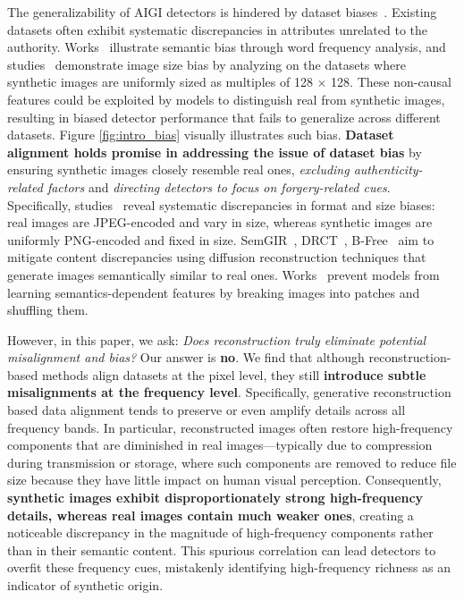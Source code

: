 \documentclass{article}
\begin{document}
The generalizability of AIGI detectors is hindered by dataset biases~\cite{grommelt2024fake, chen2024drct, rajan2025aligned, guillaro2024bias}. Existing datasets often exhibit systematic discrepancies in attributes unrelated to the authority. Works~\cite{tan2024c2p} illustrate semantic bias through word frequency analysis, and studies~\cite{sha2023fake} demonstrate image size bias by analyzing on the datasets where synthetic images are uniformly sized as multiples of 128 $\times$ 128. These non-causal features could be exploited by models to distinguish real from synthetic images, resulting in biased detector performance that fails to generalize across different datasets. Figure \ref{fig:intro_bias} visually illustrates such bias.
\textbf{Dataset alignment holds promise in addressing the issue of dataset bias} by ensuring synthetic images closely resemble real ones, \textit{excluding authenticity-related factors} and \textit{directing detectors to focus on forgery-related cues}. 
Specifically, studies~\cite{grommelt2024fake} reveal systematic discrepancies in format and size biases: real images are JPEG-encoded and vary in size, whereas synthetic images are uniformly PNG-encoded and fixed in size.  SemGIR~\cite{yu2024semgir}, DRCT~\cite{chen2024drct}, B-Free~\cite{guillaro2024bias} aim to mitigate content discrepancies using diffusion reconstruction techniques that generate images semantically similar to real ones.  
Works~\cite{gye2025sfld, zheng2024breaking,zhou2025breaking} prevent models from learning semantics-dependent features by breaking images into patches and shuffling them.


However, in this paper, we ask: \emph{Does reconstruction truly eliminate potential misalignment and bias?} Our answer is \textbf{no}. We find that although reconstruction-based methods align datasets at the pixel level, they still \textbf{introduce subtle misalignments at the frequency level}. Specifically, generative reconstruction based data alignment tends to preserve or even amplify details across all frequency bands. In particular, reconstructed images often restore high-frequency components that are diminished in real images—typically due to compression during transmission or storage, where such components are removed to reduce file size because they have little impact on human visual perception. Consequently, \textbf{synthetic images exhibit disproportionately strong high-frequency details, whereas real images contain much weaker ones}, creating a noticeable discrepancy in the magnitude of high-frequency components rather than in their semantic content. This spurious correlation can lead detectors to overfit these frequency cues, mistakenly identifying high-frequency richness as an indicator of synthetic origin.
\end{document}
